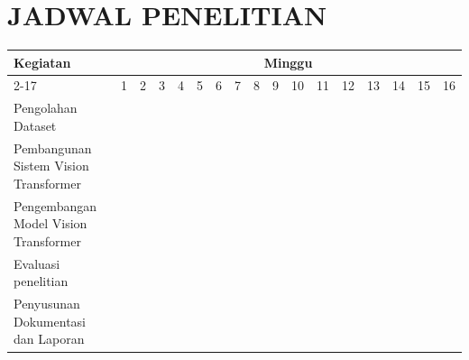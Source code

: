 \chapter{JADWAL PENELITIAN}

\newcommand{\w}{}
\newcommand{\G}{\cellcolor{gray}}
\begin{table}[H]
  \label{tbl:timeline}
  \begin{tabular}{|p{3.5cm}|c|c|c|c|c|c|c|c|c|c|c|c|c|c|c|c|}

    \hline
    \multirow{2}{*}{Kegiatan} & \multicolumn{16}{|c|}{Minggu}                                                                       \\
    \cline{2-17}              &
    1                         & 2                             & 3  & 4  & 5  & 6  & 7  & 8  & 9  & 10 & 11 & 12 & 13 & 14 & 15 & 16 \\
    \hline

    Pengolahan Dataset          &
    \G                        & \G                            & \G & \w & \w & \w & \w & \w & \w & \w & \w & \w & \w & \w & \w & \w \\
    \hline

    Pembangunan Sistem Vision Transformer           &
    \w                        & \w                            & \G & \G & \G & \w & \w & \w & \w & \w & \w & \w & \w & \w & \w & \w \\
    \hline

    Pengembangan Model Vision Transformer              &
    \w                        & \w                            & \w & \w & \w & \G & \G & \G & \G & \G & \G & \G & \w & \w & \w & \w \\
    \hline

    Evaluasi penelitian       &
    \w                        & \w                            & \w & \w & \w & \w & \w & \w & \w & \w & \w & \w & \G & \G & \w & \w \\
    \hline

    Penyusunan Dokumentasi dan Laporan       &
    \w                        & \w                            & \w & \w & \w & \w & \w & \w & \w & \w & \w & \w & \G & \G & \G & \G \\
    \hline
  \end{tabular}
\end{table}

